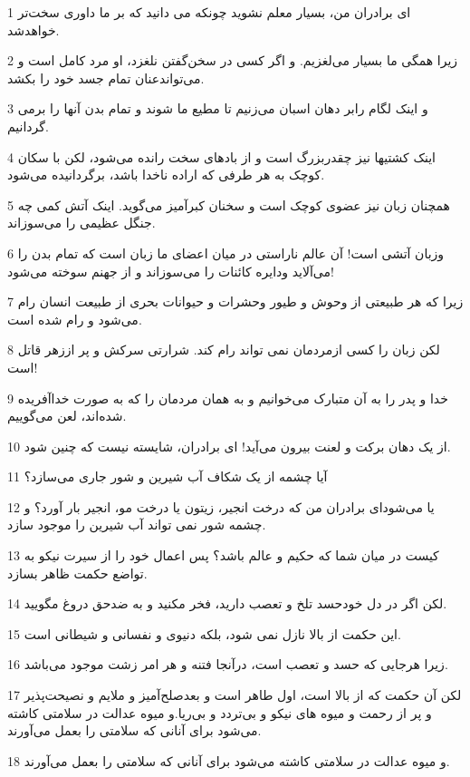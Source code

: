 \par 1 ای برادران من، بسیار معلم نشوید چونکه می دانید که بر ما داوری سخت‌تر خواهدشد.
\par 2 زیرا همگی ما بسیار می‌لغزیم. و اگر کسی در سخن‌گفتن نلغزد، او مرد کامل است و می‌تواندعنان تمام جسد خود را بکشد.
\par 3 و اینک لگام رابر دهان اسبان می‌زنیم تا مطیع ما شوند و تمام بدن آنها را برمی گردانیم.
\par 4 اینک کشتیها نیز چقدربزرگ است و از بادهای سخت رانده می‌شود، لکن با سکان کوچک به هر طرفی که اراده ناخدا باشد، برگردانیده می‌شود.
\par 5 همچنان زبان نیز عضوی کوچک است و سخنان کبرآمیز می‌گوید. اینک آتش کمی چه جنگل عظیمی را می‌سوزاند.
\par 6 وزبان آتشی است! آن عالم ناراستی در میان اعضای ما زبان است که تمام بدن را می‌آلاید ودایره کائنات را می‌سوزاند و از جهنم سوخته می‌شود!
\par 7 زیرا که هر طبیعتی از وحوش و طیور وحشرات و حیوانات بحری از طبیعت انسان رام می‌شود و رام شده است.
\par 8 لکن زبان را کسی ازمردمان نمی تواند رام کند. شرارتی سرکش و پر اززهر قاتل است!
\par 9 خدا و پدر را به آن متبارک می‌خوانیم و به همان مردمان را که به صورت خداآفریده شده‌اند، لعن می‌گوییم.
\par 10 از یک دهان برکت و لعنت بیرون می‌آید! ای برادران، شایسته نیست که چنین شود.
\par 11 آیا چشمه از یک شکاف آب شیرین و شور جاری می‌سازد؟
\par 12 یا می‌شودای برادران من که درخت انجیر، زیتون یا درخت مو، انجیر بار آورد؟ و چشمه شور نمی تواند آب شیرین را موجود سازد.
\par 13 کیست در میان شما که حکیم و عالم باشد؟ پس اعمال خود را از سیرت نیکو به تواضع حکمت ظاهر بسازد.
\par 14 لکن اگر در دل خودحسد تلخ و تعصب دارید، فخر مکنید و به ضدحق دروغ مگویید.
\par 15 این حکمت از بالا نازل نمی شود، بلکه دنیوی و نفسانی و شیطانی است.
\par 16 زیرا هرجایی که حسد و تعصب است، درآنجا فتنه و هر امر زشت موجود می‌باشد.
\par 17 لکن آن حکمت که از بالا است، اول طاهر است و بعدصلح‌آمیز و ملایم و نصیحت‌پذیر و پر از رحمت و میوه های نیکو و بی‌تردد و بی‌ریا.و میوه عدالت در سلامتی کاشته می‌شود برای آنانی که سلامتی را بعمل می‌آورند.
\par 18 و میوه عدالت در سلامتی کاشته می‌شود برای آنانی که سلامتی را بعمل می‌آورند.

